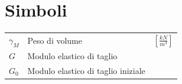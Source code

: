 \listoffigures
\newpage

\listoftables
\newpage


\chapter*{Simboli}  %

\begin{longtable}{lll} %

$\gamma_M$ & Peso di volume & $\left[ \frac{kN}{m^3} \right]$ \\
$G$ & Modulo elastico di taglio &  \\
$G_0$ & Modulo elastico di taglio iniziale &  \\

\end{longtable}

\newpage
\pagestyle{fancy}      %
